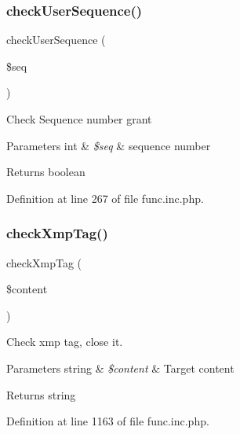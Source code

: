 \subsubsection{\texorpdfstring{check\+User\+Sequence()}{checkUserSequence()}}
{\footnotesize\ttfamily check\+User\+Sequence (\begin{DoxyParamCaption}\item[{}]{\$seq }\end{DoxyParamCaption})}

Check Sequence number grant


\begin{DoxyParams}[1]{Parameters}
int & {\em \$seq} & sequence number \\
\hline
\end{DoxyParams}
\begin{DoxyReturn}{Returns}
boolean 
\end{DoxyReturn}


Definition at line 267 of file func.\+inc.\+php.

\mbox{\label{func_8inc_8php_a2095695afd9791bcab30bc8b53a68046}} 
\subsubsection{\texorpdfstring{check\+Xmp\+Tag()}{checkXmpTag()}}
{\footnotesize\ttfamily check\+Xmp\+Tag (\begin{DoxyParamCaption}\item[{}]{\$content }\end{DoxyParamCaption})}

Check xmp tag, close it.


\begin{DoxyParams}[1]{Parameters}
string & {\em \$content} & Target content \\
\hline
\end{DoxyParams}
\begin{DoxyReturn}{Returns}
string 
\end{DoxyReturn}


Definition at line 1163 of file func.\+inc.\+php.

\mbox{\label{func_8inc_8php_a11562ea030a5d83564d0fbfcfabc8af9}} 
